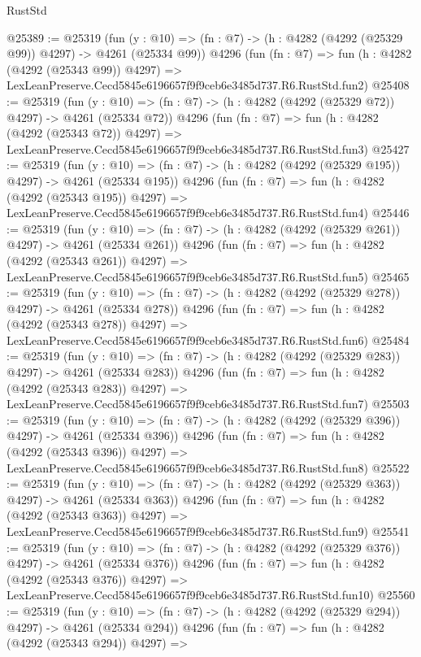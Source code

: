\begin{lexlean}{RustStd}
\begin{coremodule}
@25389 := @25319
    (fun (y : @10) => (fn : @7) -> (h : @4282 (@4292 (@25329 @99)) @4297) -> @4261 (@25334 @99))
    @4296
    (fun (fn : @7) =>
    fun (h : @4282 (@4292 (@25343 @99)) @4297) =>
    LexLeanPreserve.Cecd5845e6196657f9f9ceb6e3485d737.R6.RustStd.fun2)
@25408 := @25319
    (fun (y : @10) => (fn : @7) -> (h : @4282 (@4292 (@25329 @72)) @4297) -> @4261 (@25334 @72))
    @4296
    (fun (fn : @7) =>
    fun (h : @4282 (@4292 (@25343 @72)) @4297) =>
    LexLeanPreserve.Cecd5845e6196657f9f9ceb6e3485d737.R6.RustStd.fun3)
@25427 := @25319
    (fun (y : @10) => (fn : @7) -> (h : @4282 (@4292 (@25329 @195)) @4297) -> @4261 (@25334 @195))
    @4296
    (fun (fn : @7) =>
    fun (h : @4282 (@4292 (@25343 @195)) @4297) =>
    LexLeanPreserve.Cecd5845e6196657f9f9ceb6e3485d737.R6.RustStd.fun4)
@25446 := @25319
    (fun (y : @10) => (fn : @7) -> (h : @4282 (@4292 (@25329 @261)) @4297) -> @4261 (@25334 @261))
    @4296
    (fun (fn : @7) =>
    fun (h : @4282 (@4292 (@25343 @261)) @4297) =>
    LexLeanPreserve.Cecd5845e6196657f9f9ceb6e3485d737.R6.RustStd.fun5)
@25465 := @25319
    (fun (y : @10) => (fn : @7) -> (h : @4282 (@4292 (@25329 @278)) @4297) -> @4261 (@25334 @278))
    @4296
    (fun (fn : @7) =>
    fun (h : @4282 (@4292 (@25343 @278)) @4297) =>
    LexLeanPreserve.Cecd5845e6196657f9f9ceb6e3485d737.R6.RustStd.fun6)
@25484 := @25319
    (fun (y : @10) => (fn : @7) -> (h : @4282 (@4292 (@25329 @283)) @4297) -> @4261 (@25334 @283))
    @4296
    (fun (fn : @7) =>
    fun (h : @4282 (@4292 (@25343 @283)) @4297) =>
    LexLeanPreserve.Cecd5845e6196657f9f9ceb6e3485d737.R6.RustStd.fun7)
@25503 := @25319
    (fun (y : @10) => (fn : @7) -> (h : @4282 (@4292 (@25329 @396)) @4297) -> @4261 (@25334 @396))
    @4296
    (fun (fn : @7) =>
    fun (h : @4282 (@4292 (@25343 @396)) @4297) =>
    LexLeanPreserve.Cecd5845e6196657f9f9ceb6e3485d737.R6.RustStd.fun8)
@25522 := @25319
    (fun (y : @10) => (fn : @7) -> (h : @4282 (@4292 (@25329 @363)) @4297) -> @4261 (@25334 @363))
    @4296
    (fun (fn : @7) =>
    fun (h : @4282 (@4292 (@25343 @363)) @4297) =>
    LexLeanPreserve.Cecd5845e6196657f9f9ceb6e3485d737.R6.RustStd.fun9)
@25541 := @25319
    (fun (y : @10) => (fn : @7) -> (h : @4282 (@4292 (@25329 @376)) @4297) -> @4261 (@25334 @376))
    @4296
    (fun (fn : @7) =>
    fun (h : @4282 (@4292 (@25343 @376)) @4297) =>
    LexLeanPreserve.Cecd5845e6196657f9f9ceb6e3485d737.R6.RustStd.fun10)
@25560 := @25319
    (fun (y : @10) => (fn : @7) -> (h : @4282 (@4292 (@25329 @294)) @4297) -> @4261 (@25334 @294))
    @4296
    (fun (fn : @7) =>
    fun (h : @4282 (@4292 (@25343 @294)) @4297) =>

\end{coremodule}
\end{lexlean}
